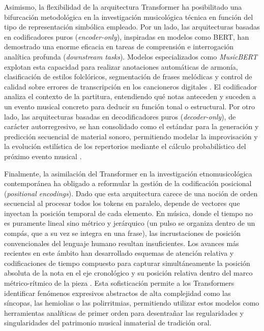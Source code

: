 Asimismo, la flexibilidad de la arquitectura Transformer ha posibilitado una bifurcación metodológica en la investigación musicológica técnica en función del tipo de representación simbólica empleado. Por un lado, las arquitecturas basadas en codificadores puros (\textit{encoder-only}), inspiradas en modelos como BERT, han demostrado una enorme eficacia en tareas de comprensión e interrogación analítica profunda (\textit{downstream tasks}). Modelos especializados como \textit{MusicBERT} explotan esta capacidad para realizar anotaciones automáticas de armonía, clasificación de estilos folclóricos, segmentación de frases melódicas y control de calidad sobre errores de transcripción en los cancioneros digitales \citep{zeng2021musicbert}. El codificador analiza el contexto de la partitura, entendiendo qué notas anteceden y suceden a un evento musical concreto para deducir su función tonal o estructural. Por otro lado, las arquitecturas basadas en decodificadores puros (\textit{decoder-only}), de carácter autorregresivo, se han consolidado como el estándar para la generación y predicción secuencial de material sonoro, permitiendo modelar la improvisación y la evolución estilística de los repertorios mediante el cálculo probabilístico del próximo evento musical \citep{dhariwal2020jukebox}.

Finalmente, la asimilación del Transformer en la investigación etnomusicológica contemporánea ha obligado a reformular la gestión de la codificación posicional (\textit{positional encodings}). Dado que esta arquitectura carece de una noción de orden secuencial al procesar todos los tokens en paralelo, depende de vectores que inyectan la posición temporal de cada elemento. En música, donde el tiempo no es puramente lineal sino métrico y jerárquico (un pulso se organiza dentro de un compás, que a su vez se integra en una frase), las incrustaciones de posición convencionales del lenguaje humano resultan insuficientes. Los avances más recientes en este ámbito han desarrollado esquemas de atención relativa y codificaciones de tiempo compuesto para capturar simultáneamente la posición absoluta de la nota en el eje cronológico y su posición relativa dentro del marco métrico-rítmico de la pieza \citep{ji2023comprehensive}. Esta sofisticación permite a los Transformers identificar fenómenos expresivos abstractos de alta complejidad como las síncopas, las hemiolias o las polirritmias, permitiendo utilizar estos modelos como herramientas analíticas de primer orden para desentrañar las regularidades y singularidades del patrimonio musical inmaterial de tradición oral.

